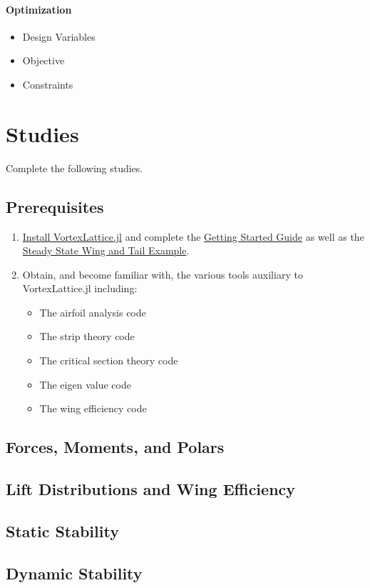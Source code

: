 \documentclass[11pt,twocolumn]{article}
\begin{document}
\paragraph{Optimization}
\begin{itemize}
	\item Design Variables
	\item Objective
	\item Constraints
\end{itemize}

\newpage

\section{Studies}
\label{sec:studies}

Complete the following studies.

\subsection{Prerequisites}
\label{ssec:prereqs}

\begin{enumerate}[label=\roman*.]
	\item \href{https://flow.byu.edu/VortexLattice.jl/stable/#Installation}{Install VortexLattice.jl} and complete the \href{https://flow.byu.edu/VortexLattice.jl/stable/guide/}{Getting Started Guide} as well as the \href{https://flow.byu.edu/VortexLattice.jl/stable/examples/#Steady-State-Analysis-of-a-Wing-and-Tail}{Steady State Wing and Tail Example}.
	\item Obtain, and become familiar with, the various tools auxiliary to VortexLattice.jl including:
	\begin{itemize}
		\item The airfoil analysis code
		\item The strip theory code
		\item The critical section theory code
		\item The eigen value code
		\item The wing efficiency code
	\end{itemize}
\end{enumerate}

\subsection{Forces, Moments, and Polars}

\subsection{Lift Distributions and Wing Efficiency}

\subsection{Static Stability}

\subsection{Dynamic Stability}
\end{document}
